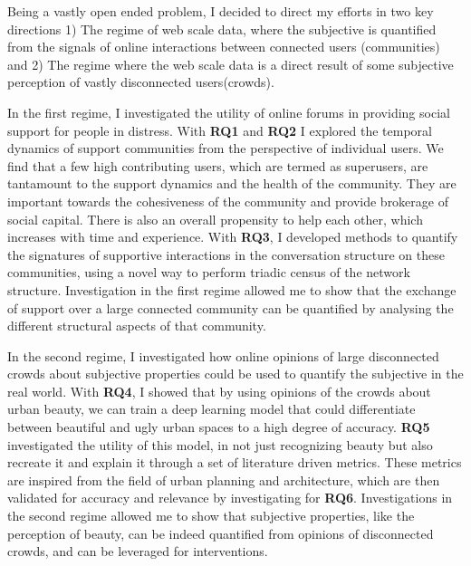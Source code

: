 \vspace{0.5cm}
\noindent{}
\vspace{0.5cm} 

Being a vastly open ended problem, I decided to direct my efforts in two key directions 1) The regime of web scale data, where the subjective is quantified from the signals of online interactions between connected users (communities) and 2) The regime where the web scale data is a direct result of some subjective perception of vastly disconnected users(crowds). 

In the first regime, I investigated the utility of online forums in providing social support for people in distress. With \textbf{RQ1} and \textbf{RQ2} I explored the temporal dynamics of support communities from the perspective of individual users. We find that a few high contributing users, which are termed as superusers, are tantamount to the support dynamics and the health of the community. They are important towards the cohesiveness of the community and provide brokerage of social capital. There is also an overall propensity to help each other, which increases with time and experience. With \textbf{RQ3}, I developed methods to quantify the signatures of supportive interactions in the conversation structure on these communities, using a novel way to perform triadic census of the network structure. Investigation in the first regime allowed me to show that the exchange of support over a large connected community can be quantified by analysing the different structural aspects of that community. 

In the second regime, I investigated how online opinions of large disconnected crowds about subjective properties could be used to quantify the subjective in the real world. With \textbf{RQ4}, I showed that by using opinions of the crowds about urban beauty, we can train a deep learning model that could differentiate between beautiful and ugly urban spaces to a high degree of accuracy. \textbf{RQ5} investigated the utility of this model, in not just recognizing beauty but also recreate it and explain it through a set of literature driven metrics. These metrics are inspired from the field of urban planning and architecture, which are then validated for accuracy and relevance by investigating for \textbf{RQ6}. Investigations in the second regime allowed me to show that subjective properties, like the perception of beauty, can be indeed quantified from opinions of disconnected crowds, and can be leveraged for interventions. 


